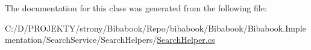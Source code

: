 The documentation for this class was generated from the following file\+:\begin{DoxyCompactItemize}
\item 
C\+:/\+D/\+P\+R\+O\+J\+E\+K\+T\+Y/strony/\+Bibabook/\+Repo/bibabook/\+Bibabook/\+Bibabook.\+Implementation/\+Search\+Service/\+Search\+Helpers/\hyperlink{_search_helper_8cs}{Search\+Helper.\+cs}\end{DoxyCompactItemize}
